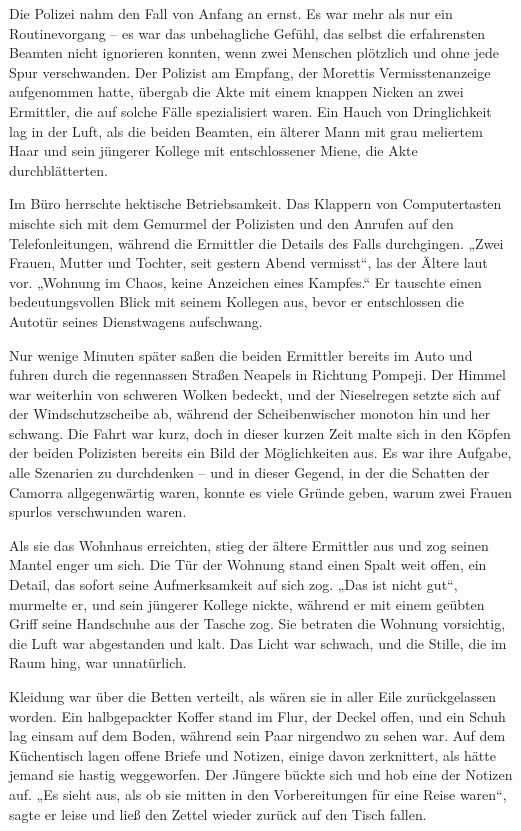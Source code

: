 \documentclass[
]{article}
\begin{document}
Die Polizei nahm den Fall von Anfang an ernst. Es war mehr als nur ein
Routinevorgang -- es war das unbehagliche Gefühl, das selbst die
erfahrensten Beamten nicht ignorieren konnten, wenn zwei Menschen
plötzlich und ohne jede Spur verschwanden. Der Polizist am Empfang, der
Morettis Vermisstenanzeige aufgenommen hatte, übergab die Akte mit einem
knappen Nicken an zwei Ermittler, die auf solche Fälle spezialisiert
waren. Ein Hauch von Dringlichkeit lag in der Luft, als die beiden
Beamten, ein älterer Mann mit grau meliertem Haar und sein jüngerer
Kollege mit entschlossener Miene, die Akte durchblätterten.

Im Büro herrschte hektische Betriebsamkeit. Das Klappern von
Computertasten mischte sich mit dem Gemurmel der Polizisten und den
Anrufen auf den Telefonleitungen, während die Ermittler die Details des
Falls durchgingen. „Zwei Frauen, Mutter und Tochter, seit gestern Abend
vermisst``, las der Ältere laut vor. „Wohnung im Chaos, keine Anzeichen
eines Kampfes.`` Er tauschte einen bedeutungsvollen Blick mit seinem
Kollegen aus, bevor er entschlossen die Autotür seines Dienstwagens
aufschwang.

Nur wenige Minuten später saßen die beiden Ermittler bereits im Auto und
fuhren durch die regennassen Straßen Neapels in Richtung Pompeji. Der
Himmel war weiterhin von schweren Wolken bedeckt, und der Nieselregen
setzte sich auf der Windschutzscheibe ab, während der Scheibenwischer
monoton hin und her schwang. Die Fahrt war kurz, doch in dieser kurzen
Zeit malte sich in den Köpfen der beiden Polizisten bereits ein Bild der
Möglichkeiten aus. Es war ihre Aufgabe, alle Szenarien zu durchdenken --
und in dieser Gegend, in der die Schatten der Camorra allgegenwärtig
waren, konnte es viele Gründe geben, warum zwei Frauen spurlos
verschwunden waren.

Als sie das Wohnhaus erreichten, stieg der ältere Ermittler aus und zog
seinen Mantel enger um sich. Die Tür der Wohnung stand einen Spalt weit
offen, ein Detail, das sofort seine Aufmerksamkeit auf sich zog. „Das
ist nicht gut``, murmelte er, und sein jüngerer Kollege nickte, während
er mit einem geübten Griff seine Handschuhe aus der Tasche zog. Sie
betraten die Wohnung vorsichtig, die Luft war abgestanden und kalt. Das
Licht war schwach, und die Stille, die im Raum hing, war unnatürlich.

Kleidung war über die Betten verteilt, als wären sie in aller Eile
zurückgelassen worden. Ein halbgepackter Koffer stand im Flur, der
Deckel offen, und ein Schuh lag einsam auf dem Boden, während sein Paar
nirgendwo zu sehen war. Auf dem Küchentisch lagen offene Briefe und
Notizen, einige davon zerknittert, als hätte jemand sie hastig
weggeworfen. Der Jüngere bückte sich und hob eine der Notizen auf. „Es
sieht aus, als ob sie mitten in den Vorbereitungen für eine Reise
waren``, sagte er leise und ließ den Zettel wieder zurück auf den Tisch
fallen.
\end{document}
